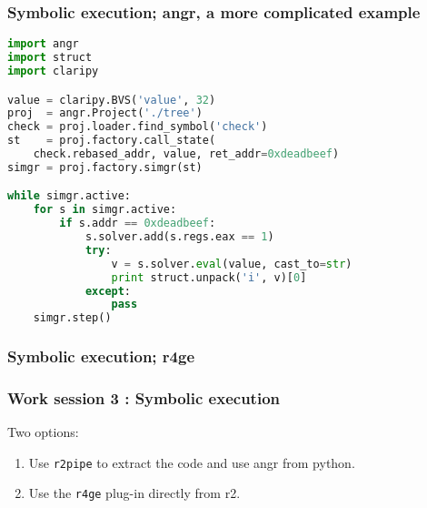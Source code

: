 \documentclass{beamer}
\begin{document}
\begin{frame}[fragile]
\frametitle{Symbolic execution; angr, a more complicated example}
\begin{lstlisting}[language=python]
import angr
import struct
import claripy

value = claripy.BVS('value', 32)
proj  = angr.Project('./tree')
check = proj.loader.find_symbol('check')
st    = proj.factory.call_state(
    check.rebased_addr, value, ret_addr=0xdeadbeef)
simgr = proj.factory.simgr(st)

while simgr.active:
    for s in simgr.active:
        if s.addr == 0xdeadbeef:
            s.solver.add(s.regs.eax == 1)
            try:
                v = s.solver.eval(value, cast_to=str)
                print struct.unpack('i', v)[0]
            except:
                pass
    simgr.step()
\end{lstlisting}
\end{frame}

\begin{frame}
\frametitle{Symbolic execution; r4ge}
\end{frame}

\begin{frame}
\frametitle{Work session 3 : Symbolic execution}
Two options:

\begin{enumerate}
    \item Use \texttt{r2pipe} to extract the code and use angr from python.
    \item Use the \texttt{r4ge} plug-in directly from r2.
\end{enumerate}

\end{frame}
\end{document}
